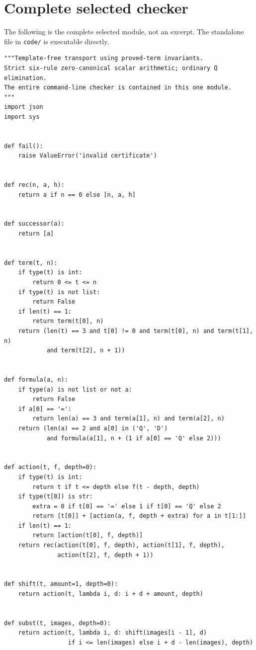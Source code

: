 \documentclass[11pt,a4paper]{article}
\theoremstyle{definition}
\begin{document}
\section{Complete selected checker}
The following is the complete selected module, not an excerpt.
The standalone file in \texttt{code/} is executable directly.
\begin{lstlisting}
"""Template-free transport using proved-term invariants.
Strict six-rule zero-canonical scalar arithmetic; ordinary Q elimination.
The entire command-line checker is contained in this one module.
"""
import json
import sys


def fail():
    raise ValueError('invalid certificate')


def rec(n, a, h):
    return a if n == 0 else [n, a, h]


def successor(a):
    return [a]


def term(t, n):
    if type(t) is int:
        return 0 <= t <= n
    if type(t) is not list:
        return False
    if len(t) == 1:
        return term(t[0], n)
    return (len(t) == 3 and t[0] != 0 and term(t[0], n) and term(t[1], n)
            and term(t[2], n + 1))


def formula(a, n):
    if type(a) is not list or not a:
        return False
    if a[0] == '=':
        return len(a) == 3 and term(a[1], n) and term(a[2], n)
    return (len(a) == 2 and a[0] in ('Q', 'D')
            and formula(a[1], n + (1 if a[0] == 'Q' else 2)))


def action(t, f, depth=0):
    if type(t) is int:
        return t if t <= depth else f(t - depth, depth)
    if type(t[0]) is str:
        extra = 0 if t[0] == '=' else 1 if t[0] == 'Q' else 2
        return [t[0]] + [action(a, f, depth + extra) for a in t[1:]]
    if len(t) == 1:
        return [action(t[0], f, depth)]
    return rec(action(t[0], f, depth), action(t[1], f, depth),
               action(t[2], f, depth + 1))


def shift(t, amount=1, depth=0):
    return action(t, lambda i, d: i + d + amount, depth)


def subst(t, images, depth=0):
    return action(t, lambda i, d: shift(images[i - 1], d)
                  if i <= len(images) else i + d - len(images), depth)



\end{lstlisting}
\end{document}
